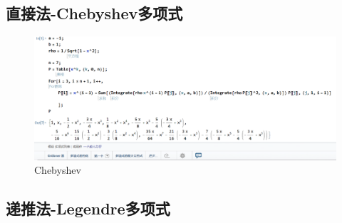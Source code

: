 \subsection{直接法-Chebyshev多项式}

\begin{figure}[H]
	\centering
	\includegraphics[width = 1\linewidth]{day6/fig2.png}
	\caption{Chebyshev}
\end{figure}
\subsection{递推法-Legendre多项式}


